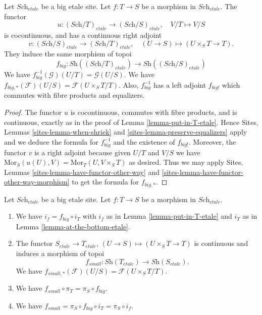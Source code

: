 \begin{lemma}
\label{lemma-morphism-big-etale}
Let $\textit{Sch}_{etale}$ be a big etale site.
Let $f : T \to S$ be a morphism in $\textit{Sch}_{etale}$.
The functor
$$
u : (\textit{Sch}/T)_{etale} \longrightarrow (\textit{Sch}/S)_{etale},
\quad
V/T \longmapsto V/S
$$
is cocontinuous, and has a continuous right adjoint
$$
v : (\textit{Sch}/S)_{etale} \longrightarrow (\textit{Sch}/T)_{etale},
\quad
(U \to S) \longmapsto (U \times_S T \to T).
$$
They induce the same morphism of topoi
$$
f_{big} :
\textit{Sh}((\textit{Sch}/T)_{etale})
\longrightarrow
\textit{Sh}((\textit{Sch}/S)_{etale})
$$
We have $f_{big}^{-1}(\mathcal{G})(U/T) = \mathcal{G}(U/S)$.
We have $f_{big, *}(\mathcal{F})(U/S) = \mathcal{F}(U\times_ST/T)$.
Also, $f_{big}^{-1}$ has a left adjoint $f_{big!}$ which commutes with
fibre products and equalizers.
\end{lemma}

\begin{proof}
The functor $u$ is cocontinuous, commutes with fibre products,
and is continuous, exactly as in the proof of Lemma \ref{lemma-put-in-T-etale}.
Hence Sites, Lemmas \ref{sites-lemma-when-shriek}
and \ref{sites-lemma-preserve-equalizers}
apply and we deduce the formula
for $f_{big}^{-1}$ and the existence of $f_{big!}$. Moreover,
the functor $v$ is a right adjoint because given $U/T$ and $V/S$
we have $\text{Mor}_S(u(U), V) = \text{Mor}_T(U, V\times_S T)$
as desired. Thus we may apply
Sites, Lemmas \ref{sites-lemma-have-functor-other-way} and
\ref{sites-lemma-have-functor-other-way-morphism} to get the
formula for $f_{big, *}$.
\end{proof}

\begin{lemma}
\label{lemma-morphism-big-small-etale}
Let $\textit{Sch}_{etale}$ be a big etale site.
Let $f : T \to S$ be a morphism in $\textit{Sch}_{etale}$.
\begin{enumerate}
\item We have $i_f = f_{big} \circ i_T$ with $i_f$ as in
Lemma \ref{lemma-put-in-T-etale} and $i_T$ as in
Lemma \ref{lemma-at-the-bottom-etale}.
\item The functor $S_{etale} \to T_{etale}$,
$(U \to S) \mapsto (U \times_S T \to T)$ is continuous and induces
a morphism of topoi
$$
f_{small} :
\textit{Sh}(T_{etale})
\longrightarrow
\textit{Sh}(S_{etale}).
$$
We have $f_{small, *}(\mathcal{F})(U/S) = \mathcal{F}(U\times_S T/T)$.
\item We have $f_{small} \circ \pi_T = \pi_S \circ f_{big}$.
\item We have $f_{small} = \pi_S \circ f_{big} \circ i_T = \pi_S \circ i_f$.
\end{enumerate}
\end{lemma}


